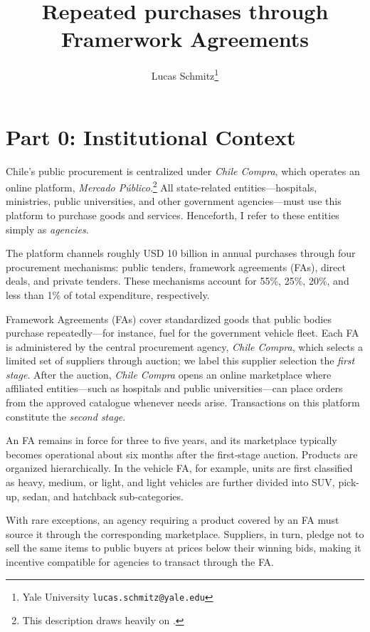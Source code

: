 \documentclass[12pt]{article}
\theoremstyle{plain}
\theoremstyle{plain}
\begin{document}
 

\newpage
 \title{{\Large Repeated purchases through Framerwork Agreements}}
\author{Lucas Schmitz\thanks{Yale University \texttt{lucas.schmitz@yale.edu}}} 
\date{}
\maketitle


\section{ Part 0: Institutional Context} 

Chile’s public procurement is centralized under \textit{Chile Compra}, which operates an online platform, \textit{Mercado Público}.\footnote{This description draws heavily on \textcite{castro_estudio_2020}.}  All state-related entities—hospitals, ministries, public universities, and other government agencies—must use this platform to purchase goods and services.  Henceforth, I refer to these entities simply as \textit{agencies}.

The platform channels roughly USD 10 billion in annual purchases through four procurement mechanisms: public tenders, framework agreements (FAs), direct deals, and private tenders.  These mechanisms account for  55\%, 25\%, 20\%, and less than 1\% of total expenditure, respectively.

Framework Agreements (FAs) cover standardized goods that public bodies purchase repeatedly—for instance, fuel for the government vehicle fleet. Each FA is administered by the central procurement agency, \textit{Chile Compra}, which  selects a limited set of suppliers through  auction; we label this supplier selection the \emph{first stage}. After the auction, \textit{Chile Compra} opens an online marketplace where affiliated entities—such as hospitals and public universities—can place orders from the approved catalogue whenever needs arise. Transactions on this platform constitute the \emph{second stage}.

An FA remains in force for three to five years, and its marketplace typically becomes operational about six months after the first‐stage auction. Products are organized hierarchically. In the vehicle FA, for example, units are first classified as heavy, medium, or light, and light vehicles are further divided into SUV, pick-up, sedan, and hatchback sub-categories.

With rare exceptions, an agency requiring a product covered by an FA must source it through the corresponding marketplace. Suppliers, in turn, pledge not to sell the same items to public buyers at prices below their winning bids, making it incentive compatible for agencies to transact through the FA.
 
\end{document}
